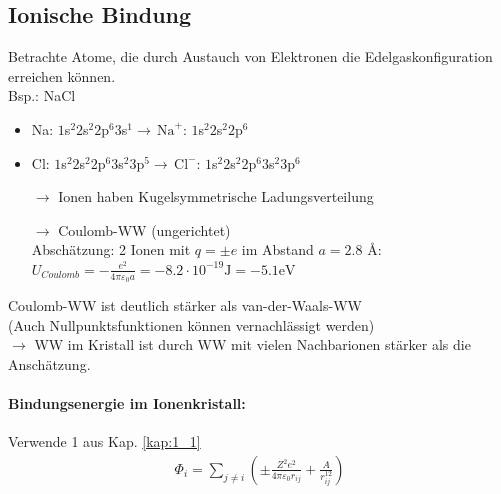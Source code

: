 \subsection{Ionische Bindung} \label{kap:1_3}
	Betrachte Atome, die durch Austauch von Elektronen die Edelgaskonfiguration erreichen können.\\
	Bsp.: NaCl
	\begin{itemize}
		\item Na: $1$s$^2 2$s$^2 2$p$^6 3$s$^1 \rightarrow \, \text{Na}^+: \, 1$s$^2 2$s$^2 2$p$^6$
		\item Cl: $1$s$^2 2$s$^2 2$p$^6 3$s$^2 3$p$^5 \rightarrow \, \text{Cl}^-: \, 1$s$^2 2$s$^2 2$p$^6 3$s$^2 3$p$^6$
	\end{itemize}
	\begin{itemize}
		\item[$\rightarrow$] Ionen haben Kugelsymmetrische Ladungsverteilung
		\item[$\rightarrow$] Coulomb-WW (ungerichtet)\\
			Abschätzung: 2 Ionen mit $q = \pm e$ im Abstand $a = 2.8$ \AA:\\ $U_{Coulomb} = -\frac{e^2}{4 \pi \varepsilon_0 a} = - 8.2 \cdot 10^{-19} \text{J} = -5.1 \text{eV}$
	\end{itemize}

	Coulomb-WW ist deutlich stärker als van-der-Waals-WW \\
	(Auch Nullpunktsfunktionen können vernachlässigt werden)\\
	$\rightarrow$ WW im Kristall ist durch WW mit vielen Nachbarionen stärker als die Anschätzung.

\paragraph{Bindungsenergie im Ionenkristall:}
	Verwende 1 aus Kap. \ref{kap:1_1}
	\begin{align*}
		\Phi_i  = \sum_{j \neq i} \left(\pm \frac{Z^2 e^2}{4 \pi \varepsilon_0 r_{ij}} + \frac{A}{r_{ij}^{12}}\right)
	\end{align*}

